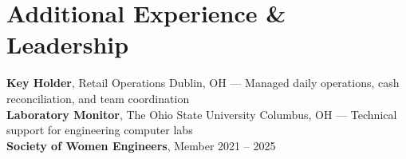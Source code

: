 \documentclass[letterpaper,10.5pt]{article}
\begin{document}
\section{Additional Experience \& Leadership}
 \begin{itemize}[leftmargin=0.15in, label={}]
    \small{\item{
     \textbf{Key Holder}, Retail Operations \hfill Dublin, OH --- Managed daily operations, cash reconciliation, and team coordination \\
     \textbf{Laboratory Monitor}, The Ohio State University \hfill Columbus, OH --- Technical support for engineering computer labs \\
     \textbf{Society of Women Engineers}, Member \hfill 2021 -- 2025
    }}
 \end{itemize}

\end{document}
